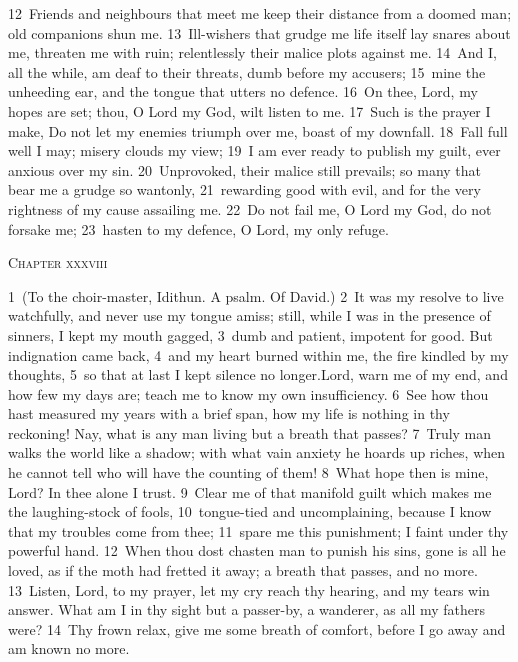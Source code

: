 \documentclass[10pt]{book} %
\begin{document}
\textcolor{benred8}{12}~Friends and neighbours that meet me keep their distance from a doomed man; old companions shun me. \textcolor{benred8}{13}~Ill-wishers that grudge me life itself lay snares about me, threaten me with ruin; relentlessly their malice plots against me. \textcolor{benred8}{14}~And I, all the while, am deaf to their threats, dumb before my accusers; \textcolor{benred8}{15}~mine the unheeding ear, and the tongue that utters no defence. \textcolor{benred8}{16}~On thee, Lord, my hopes are set; thou, O Lord my God, wilt listen to me. \textcolor{benred8}{17}~Such is the prayer I make, Do not let my enemies triumph over me, boast of my downfall. \textcolor{benred8}{18}~Fall full well I may; misery clouds my view; \textcolor{benred8}{19}~I am ever ready to publish my guilt, ever anxious over my sin. \textcolor{benred8}{20}~Unprovoked, their malice still prevails; so many that bear me a grudge so wantonly, \textcolor{benred8}{21}~rewarding good with evil, and for the very rightness of my cause assailing me. \textcolor{benred8}{22}~Do not fail me, O Lord my God, do not forsake me; \textcolor{benred8}{23}~hasten to my defence, O Lord, my only refuge.
\begin{large}\begin{center}\textsc{Chapter xxxviii}\end{center}\end{large}
\textcolor{benred8}{1}~(To the choir-master, Idithun. A psalm. Of David.)
\textcolor{benred8}{2}~It was my resolve to live watchfully, and never use my tongue amiss; still, while I was in the presence of sinners, I kept my mouth gagged, \textcolor{benred8}{3}~dumb and patient, impotent for good. But indignation came back, \textcolor{benred8}{4}~and my heart burned within me, the fire kindled by my thoughts, \textcolor{benred8}{5}~so that at last I kept silence no longer.Lord, warn me of my end, and how few my days are; teach me to know my own insufficiency. \textcolor{benred8}{6}~See how thou hast measured my years with a brief span, how my life is nothing in thy reckoning! Nay, what is any man living but a breath that passes? \textcolor{benred8}{7}~Truly man walks the world like a shadow; with what vain anxiety he hoards up riches, when he cannot tell who will have the counting of them! \textcolor{benred8}{8}~What hope then is mine, Lord? In thee alone I trust. \textcolor{benred8}{9}~Clear me of that manifold guilt which makes me the laughing-stock of fools, \textcolor{benred8}{10}~tongue-tied and uncomplaining, because I know that my troubles come from thee; \textcolor{benred8}{11}~spare me this punishment; I faint under thy powerful hand. \textcolor{benred8}{12}~When thou dost chasten man to punish his sins, gone is all he loved, as if the moth had fretted it away; a breath that passes, and no more. \textcolor{benred8}{13}~Listen, Lord, to my prayer, let my cry reach thy hearing, and my tears win answer. What am I in thy sight but a passer-by, a wanderer, as all my fathers were? \textcolor{benred8}{14}~Thy frown relax, give me some breath of comfort, before I go away and am known no more.
\end{document}
